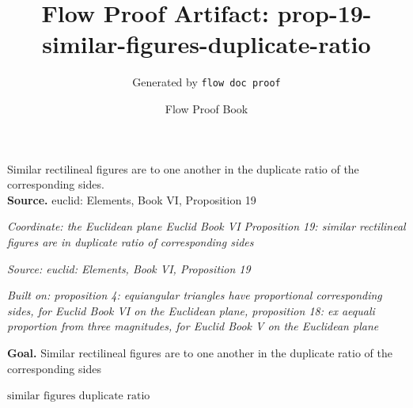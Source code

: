 \documentclass[11pt]{article}
\title{Flow Proof Artifact: prop-19-similar-figures-duplicate-ratio}
\author{Generated by \texttt{flow doc proof}}
\date{Flow Proof Book}
\theoremstyle{definition}
\begin{document}
\maketitle
Similar rectilineal figures are to one another in the duplicate ratio of the corresponding sides.\\[0.5em]
\textbf{Source.} euclid: Elements, Book VI, Proposition 19\\[0.5em]
\bigskip
{}\par
\smallskip\noindent\textit{Coordinate: the Euclidean plane \cdot Euclid Book VI \cdot Proposition 19: similar rectilineal figures are in duplicate ratio of corresponding sides}\par
\smallskip\noindent\textit{Source: euclid: Elements, Book VI, Proposition 19}\par
\smallskip\noindent\textit{Built on: proposition 4: equiangular triangles have proportional corresponding sides, for Euclid Book VI on the Euclidean plane, proposition 18: ex aequali proportion from three magnitudes, for Euclid Book V on the Euclidean plane}\par
\medskip
\noindent\textbf{Goal.} Similar rectilineal figures are to one another in the duplicate ratio of the corresponding sides\par
\noindent$\displaystyle \text{similar figures duplicate ratio}$\par
\medskip
\noindent
\end{document}

